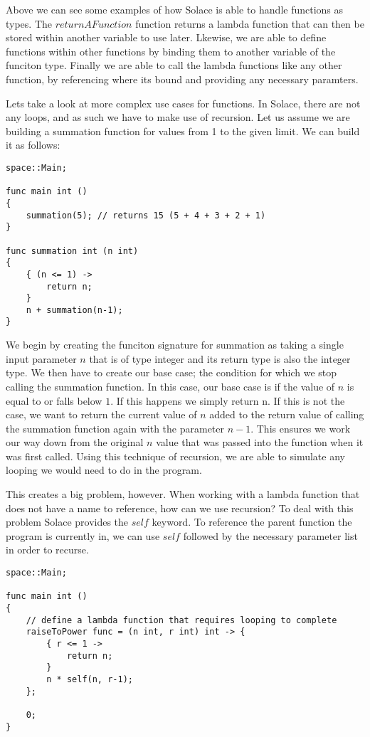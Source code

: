 \documentclass{article}
\begin{document}
Above we can see some examples of how Solace is able to handle functions as types. The $returnAFunction$ function returns a lambda function
that can then be stored within another variable to use later. Lkewise, we are able to define functions within other functions by binding them
to another variable of the funciton type. Finally we are able to call the lambda functions like any other function, by referencing where its
bound and providing any necessary paramters.

Lets take a look at more complex use cases for functions. In Solace, there are not any loops, and as such we have to make use of recursion.
Let us assume we are building a summation function for values from 1 to the given limit. We can build it as follows:

\begin{lstlisting}
space::Main;

func main int ()
{
	summation(5); // returns 15 (5 + 4 + 3 + 2 + 1)
}

func summation int (n int)
{
	{ (n <= 1) ->
		return n;
	}
	n + summation(n-1);
} 
\end{lstlisting}

We begin by creating the funciton signature for summation as taking a single input parameter $n$ that is of type integer and its return type is also the integer type.
We then have to create our base case; the condition for which we stop calling the summation function. In this case, our base case is if the value of $n$ is equal to
or falls below $1$. If this happens we simply return n. If this is not the case, we want to return the current value of $n$ added to the return value of calling the
summation function again with the parameter $n-1$. This ensures we work our way down from the original $n$ value that was passed into the function when it was first
called. Using this technique of recursion, we are able to simulate any looping we would need to do in the program.

This creates a big problem, however. When working with a lambda function that does not have a name to reference, how can we use recursion? To deal with this problem
Solace provides the $self$ keyword. To reference the parent function the program is currently in, we can use $self$ followed by the necessary parameter list in order
to recurse.

\begin{lstlisting}
space::Main;

func main int ()
{
	// define a lambda function that requires looping to complete
	raiseToPower func = (n int, r int) int -> {
		{ r <= 1 ->
			return n;
		}
		n * self(n, r-1);
	};

	0;
}
\end{lstlisting}
\end{document}
